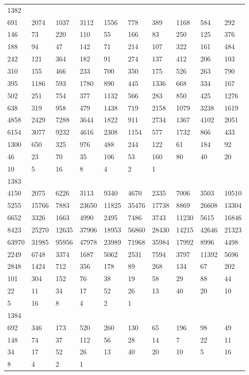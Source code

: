 \begin{longtable}{*{10}{l}}
1382&&&&&&&&&\\
691& 2074& 1037& 3112& 1556& 778& 389& 1168& 584& 292\\
146& 73& 220& 110& 55& 166& 83& 250& 125& 376\\
188& 94& 47& 142& 71& 214& 107& 322& 161& 484\\
242& 121& 364& 182& 91& 274& 137& 412& 206& 103\\
310& 155& 466& 233& 700& 350& 175& 526& 263& 790\\
395& 1186& 593& 1780& 890& 445& 1336& 668& 334& 167\\
502& 251& 754& 377& 1132& 566& 283& 850& 425& 1276\\
638& 319& 958& 479& 1438& 719& 2158& 1079& 3238& 1619\\
4858& 2429& 7288& 3644& 1822& 911& 2734& 1367& 4102& 2051\\
6154& 3077& 9232& 4616& 2308& 1154& 577& 1732& 866& 433\\
1300& 650& 325& 976& 488& 244& 122& 61& 184& 92\\
46& 23& 70& 35& 106& 53& 160& 80& 40& 20\\
10& 5& 16& 8& 4& 2& 1& \\

1383&&&&&&&&&\\
4150& 2075& 6226& 3113& 9340& 4670& 2335& 7006& 3503& 10510\\
5255& 15766& 7883& 23650& 11825& 35476& 17738& 8869& 26608& 13304\\
6652& 3326& 1663& 4990& 2495& 7486& 3743& 11230& 5615& 16846\\
8423& 25270& 12635& 37906& 18953& 56860& 28430& 14215& 42646& 21323\\
63970& 31985& 95956& 47978& 23989& 71968& 35984& 17992& 8996& 4498\\
2249& 6748& 3374& 1687& 5062& 2531& 7594& 3797& 11392& 5696\\
2848& 1424& 712& 356& 178& 89& 268& 134& 67& 202\\
101& 304& 152& 76& 38& 19& 58& 29& 88& 44\\
22& 11& 34& 17& 52& 26& 13& 40& 20& 10\\
5& 16& 8& 4& 2& 1& \\

1384&&&&&&&&&\\
692& 346& 173& 520& 260& 130& 65& 196& 98& 49\\
148& 74& 37& 112& 56& 28& 14& 7& 22& 11\\
34& 17& 52& 26& 13& 40& 20& 10& 5& 16\\
8& 4& 2& 1& \\


\end{longtable}
